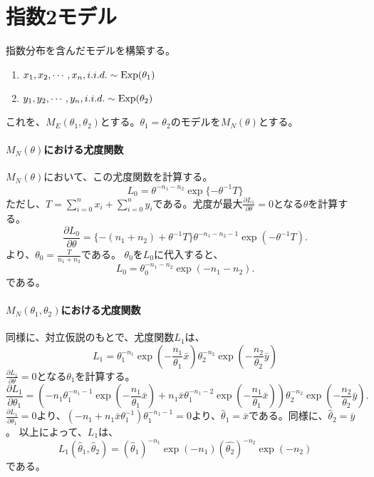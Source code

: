 \section{指数2モデル}
指数分布を含んだモデルを構築する。
\begin{enumerate}
 \item $x_1,x_2,\cdots,x_n,i.i.d. \sim \rm{Exp}(\theta_1)$
 \item $y_1,y_2,\cdots,y_n,i.i.d. \sim \rm{Exp}(\theta_2)$
\end{enumerate}
これを、$M_E(\theta_1,\theta_2)$とする。$\theta_1=\theta_2$のモデルを$M_N(\theta)$とする。
\paragraph{$M_N(\theta)$における尤度関数}
$M_N(\theta)$において、この尤度関数を計算する。
\begin{equation*}
 L_{0} = \theta^{-n_1-n_2}\exp\{-\theta^{-1}T\}
\end{equation*}
ただし、$T=\sum_{i=0}^n x_i+\sum_{i=0}^n y_i$である。尤度が最大$\frac{\partial L_1}{\partial\theta}=0$となる$\theta$を計算する。
\begin{equation}
    \frac{\partial L_0}{\partial\theta} = \{ -(n_1+n_2)+\theta^{-1}T \}\theta^{-n_1-n_2-1}\exp(-\theta^{-1}T).
\end{equation}
より、$\theta_0=\frac{T}{n_1+n_2}$である。
$\theta_0$を$L_{0}$に代入すると、
\begin{equation}
    L_{0} = \theta_0^{-n_1-n_2}\exp(-n_1-n_2).
\end{equation}
である。

\paragraph{$M_N(\theta_1,\theta_2)$における尤度関数}
同様に、対立仮説のもとで、尤度関数$L_{1}$は、
\begin{equation}
    L_{1} = \theta_1^{-n_1}\exp\left(-\frac{n_1}{\theta_1}\bar{x}\right)\theta_2^{-n_2}\exp\left(-\frac{n_2}{\theta_2}\bar{y}\right)
\end{equation}
$\frac{\partial L_1}{\partial\theta}=0$となる$\theta_1$を計算する。
\begin{equation}
    \frac{\partial L_1}{\partial\theta_1}=\left( -n_1\theta_1^{-n_1-1} \exp\left(-\frac{n_1}{\theta_1}\bar{x}\right)+n_1\bar{x}\theta_1^{-n_1-2}\exp\left(-\frac{n_1}{\theta_1}\bar{x}\right)\right)\theta_2^{-n_2}\exp\left(-\frac{n_2}{\theta_2}\bar{y}\right).
\end{equation}
$ \frac{\partial L_1}{\partial\theta_1}=0$より、$(-n_1+n_1\bar{x}\theta_1^{-1})\theta_1^{-n_1-1}=0$より、$\hat{\theta}_1=\bar{x}$である。同様に、$\hat{\theta}_2=\bar{y}$。
以上によって、$L_{1}$は、
\begin{equation}
    L_{1}(\hat{\theta}_1,\hat{\theta}_2) = (\hat{\theta}_1)^{-n_1}\exp(-n_1)(\hat{\theta_2})^{-n_2}\exp(-n_2)
\end{equation}
である。

